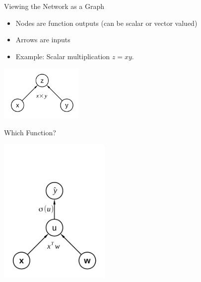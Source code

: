 \begin{vbframe}{Viewing the Network as a Graph}

\vfill

\begin{itemize}
\item Nodes are function outputs (can be scalar or vector valued)
\item Arrows are inputs
\item Example: Scalar multiplication $z = x y$.
\end{itemize}
\begin{center}
\includegraphics[width = 0.3\textwidth]{./figure/simple_mult_graph}
\end{center}

\vfill

\end{vbframe}



\begin{vbframe}{Which Function?}

\vfill

\begin{center}
\includegraphics[width = 0.4\textwidth]{./figure/sigmoid_graph}
\end{center}

\vfill

\end{vbframe}



